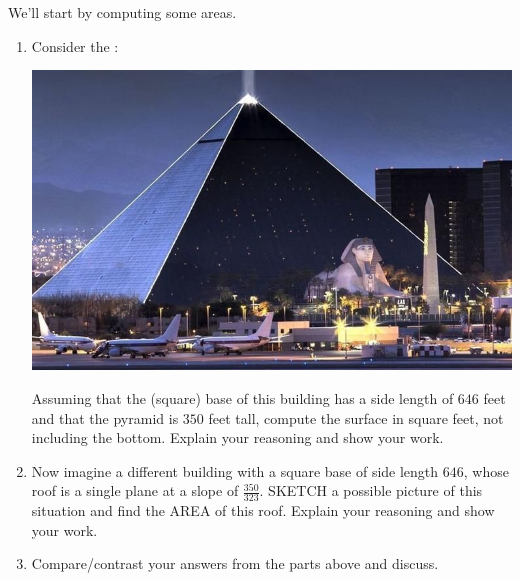 \documentclass[hints,nooutcomes,noauthor,handout,12pt]{ximera}
\begin{document}
\begin{question} We'll start by computing some areas.
\begin{enumerate}
\item Consider the :
  \begin{center}
    \includegraphics[width=.4\textwidth]{pyramid.jpg} 
  \end{center}
 Assuming that the (square) base of this building has a side length of
 $646$ feet and that the pyramid is $350$ feet tall, compute the
 surface in square feet, not including the bottom. Explain your
 reasoning and show your work.
\item Now imagine a different building with a square base of side
  length $646$, whose roof is a single plane at a slope of
  $\tfrac{350}{323}$. SKETCH a possible picture of this situation and
  find the AREA of this roof. Explain your reasoning and show your
  work.

\item Compare/contrast your answers from the parts above and discuss. 
\end{enumerate}
\end{question}
 
 \mynewpage
 
\end{document}
